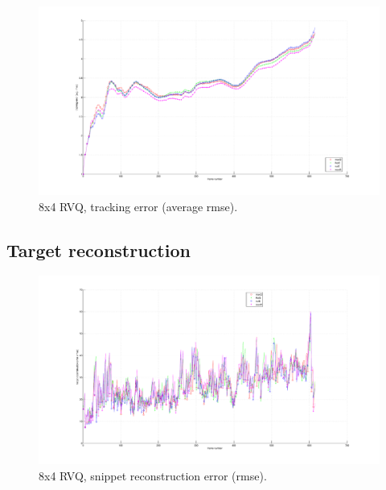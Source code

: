 								\begin{figure}[h!]
								\centering
								\includegraphics[height=0.38\textheight]{thesis/3_sylv_8_4_1000_trk_armse.pdf}
								\caption{8x4 RVQ, tracking error (average rmse).}
								\label{fig:3_sylv_8_4_1000_trk_avg_rmse}
								\end{figure}

\clearpage
\newpage
\subsection{Target reconstruction}

								\begin{figure}[h!]
								\centering
								\includegraphics[height=0.4\textheight]{thesis/3_sylv_8_4_1000_snp_rmse.pdf}
								\caption{8x4 RVQ, snippet reconstruction error (rmse).}
								\label{fig:3_sylv_8_4_1000_snp_rmse}
								\end{figure}


